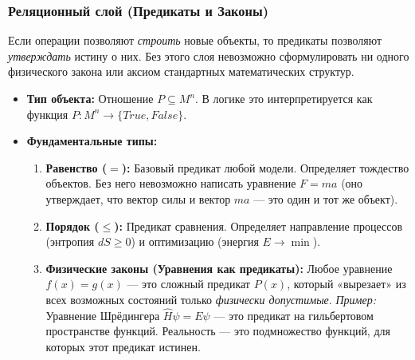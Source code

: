 \documentclass[11pt, a4paper]{extarticle}
\renewcommand{\le}{\leqslant}
\renewcommand{\ge}{\geqslant}
\begin{document}
\subsubsection{Реляционный слой (Предикаты и Законы)}
Если операции позволяют \textit{строить} новые объекты, то предикаты позволяют \textit{утверждать} истину о них. Без этого слоя невозможно сформулировать ни одного физического закона или аксиом стандартных математических структур.

\begin{itemize}
    \item \textbf{Тип объекта:} Отношение $P \subseteq M^n$. В логике это интерпретируется как функция $P: M^n \to \{True, False\}$.
    \item \textbf{Фундаментальные типы:}
    \begin{enumerate}
        \item \textbf{Равенство ($=$):} Базовый предикат любой модели.
        Определяет тождество объектов. Без него невозможно написать уравнение $F=ma$ (оно утверждает, что вектор силы и вектор $ma$ — это один и тот же объект).
        
        \item \textbf{Порядок ($\le$):} Предикат сравнения.
        Определяет направление процессов (энтропия $dS \ge 0$) и оптимизацию (энергия $E \to \min$).
        
        \item \textbf{Физические законы (Уравнения как предикаты):}
        Любое уравнение $f(x) = g(x)$ — это сложный предикат $P(x)$, который «вырезает» из всех возможных состояний только \textit{физически допустимые}.
        \textit{Пример:} Уравнение Шрёдингера $\hat{H}\psi = E\psi$ — это предикат на гильбертовом пространстве функций. Реальность — это подмножество функций, для которых этот предикат истинен.
    \end{enumerate}
\end{itemize}
\end{document}
